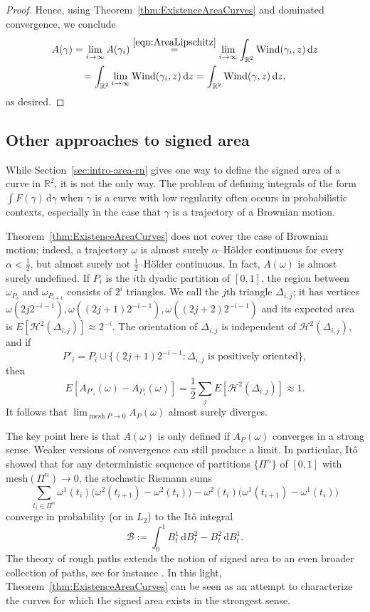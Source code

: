 \documentclass[12pt,reqno]{amsart}
\newcommand{\cH}{\mathcal{H}}
\DeclareMathOperator{\mesh}{mesh}
\newcommand{\R}{\mathbb{R}}
\newcommand{\ud}[0]{\,\mathrm{d}}
\theoremstyle{remark}
\newcommand{\0}{\mathbf{0}}
\renewcommand{\1}{\mathbf 1}
\DeclareMathOperator{\Wind}{Wind}
\begin{document}
\begin{proof}
  Hence, using Theorem~\ref{thm:ExistenceAreaCurves} and dominated convergence, we conclude
  \begin{multline*}
    A(\gamma)  =\lim_{i\to\infty}A(\gamma_i) \stackrel{\eqref{eqn:AreaLipschitz}}{=} \lim_{i\to\infty} \int_{\mathbb R^2}\Wind(\gamma_i,z)\ud z \\
    = \int_{\mathbb R^2}\lim_{i\to\infty}\Wind(\gamma_i,z)\ud z = \int_{\mathbb R^2}\Wind(\gamma,z)\ud z,
    \end{multline*}
  as desired.
\end{proof}

\subsection{Other approaches to signed area}\label{sec:Probability}
While Section~\ref{sec:intro-area-rn} gives one way to define the signed area of a curve in $\R^2$, it is not the only way. The problem of defining integrals of the form $\int F(\gamma) \ud \gamma$ when $\gamma$ is a curve with low regularity often occurs in probabilistic contexts, especially in the case that $\gamma$ is a trajectory of a Brownian motion.

Theorem~\ref{thm:ExistenceAreaCurves} does not cover the case of Brownian motion; indeed, a trajectory $\omega$ is almost surely $\alpha$--H\"older continuous for every $\alpha<\frac{1}{2}$, but almost surely not $\frac{1}{2}$--H\"older continuous. In fact,  $A(\omega)$ is almost surely undefined. If $P_i$ is the $i$th dyadic partition of $[0,1]$, the region between $\omega_{P_i}$ and $\omega_{P_{i+1}}$ consists of $2^i$ triangles. We call the $j$th triangle $\Delta_{i,j}$; it has vertices $\omega(2j2^{-i-1}), \omega((2j+1)2^{-i-1}), \omega((2j+2)2^{-i-1})$ and its expected area is $E[\cH^2(\Delta_{i,j})] \approx 2^{-i}$. The orientation of $\Delta_{i,j}$ is independent of $\cH^2(\Delta_{i,j})$, and if
$$P'_i=P_i\cup \{(2j+1)2^{-i-1} : \Delta_{i,j} \text{ is positively oriented}\},$$
then
$$E[A_{P'_i}(\omega) - A_{P_i}(\omega)] = \frac{1}{2} \sum_j E[\cH^2(\Delta_{i,j})] \approx 1.$$
It follows that $\lim_{\mesh P\to 0} A_P(\omega)$ almost surely diverges. 

The key point here is that $A(\omega)$ is only defined if $A_P(\omega)$ converges in a strong sense. Weaker versions of convergence can still produce a limit. In particular, It\^o showed that for any deterministic sequence of partitions $\{\Pi^n\}$ of $[0,1]$ with $\mathrm{mesh}(\Pi^n)\to 0$, the stochastic Riemann sums
\[
\sum_{t_i\in \Pi^n} \omega^1(t_i) \bigl(\omega^2(t_{i+1})-\omega^2(t_i)\bigr) - \omega^2(t_i) \bigl(\omega^1(t_{i+1})-\omega^1(t_i)\bigr)
\]
converge in probability (or in $L_2$) to the It\^o integral 
\[
\mathcal{B} := \int_0^1 B^1_t \ud B^2_t - B^2_t \ud B^1_t.
\]
The theory of rough paths extends the notion of signed area to an even broader collection of paths, see for instance \cite{FrizHairer}. In this light, Theorem~\ref{thm:ExistenceAreaCurves} can be seen as an attempt to characterize the curves for which the signed area exists in the strongest sense.

\printbibliography[title={References}] 
\end{document}
